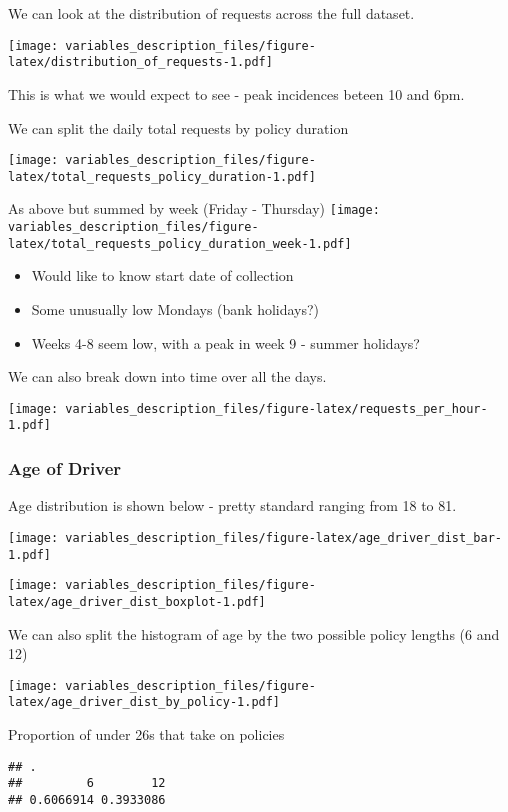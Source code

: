\documentclass[]{article}
\providecommand{\tightlist}{%
  \setlength{\itemsep}{0pt}\setlength{\parskip}{0pt}}
\begin{document}
We can look at the distribution of requests across the full dataset.

\texttt{[image: variables\_description\_files/figure-latex/distribution\_of\_requests-1.pdf]}

This is what we would expect to see - peak incidences beteen 10 and 6pm.

We can split the daily total requests by policy duration

\texttt{[image: variables\_description\_files/figure-latex/total\_requests\_policy\_duration-1.pdf]}

As above but summed by week (Friday - Thursday)
\texttt{[image: variables\_description\_files/figure-latex/total\_requests\_policy\_duration\_week-1.pdf]}

\begin{itemize}
\tightlist
\item
  Would like to know start date of collection
\item
  Some unusually low Mondays (bank holidays?)
\item
  Weeks 4-8 seem low, with a peak in week 9 - summer holidays?
\end{itemize}

We can also break down into time over all the days.

\texttt{[image: variables\_description\_files/figure-latex/requests\_per\_hour-1.pdf]}

\subsubsection{Age of Driver}\label{age-of-driver}

Age distribution is shown below - pretty standard ranging from 18 to 81.

\texttt{[image: variables\_description\_files/figure-latex/age\_driver\_dist\_bar-1.pdf]}

\texttt{[image: variables\_description\_files/figure-latex/age\_driver\_dist\_boxplot-1.pdf]}

We can also split the histogram of age by the two possible policy
lengths (6 and 12)

\texttt{[image: variables\_description\_files/figure-latex/age\_driver\_dist\_by\_policy-1.pdf]}

Proportion of under 26s that take on policies

\begin{verbatim}
## .
##         6        12 
## 0.6066914 0.3933086
\end{verbatim}
\end{document}
